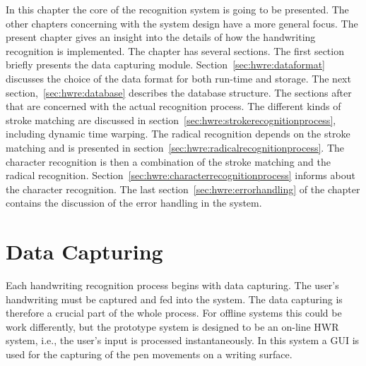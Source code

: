 In this chapter the core of the recognition system is going to be presented.
The other chapters concerning with the system design have a more general focus.
The present chapter gives an insight into the details of how the handwriting
recognition is implemented. The chapter has several sections. The first section
briefly presents the data capturing module. Section~\ref{sec:hwre:dataformat}
discusses the choice of the data format for both run-time and storage.
The next section,~\ref{sec:hwre:database} describes the database structure.
The sections after that are concerned with the actual recognition process.
The different kinds of stroke matching are discussed in 
section~\ref{sec:hwre:strokerecognitionprocess}, including dynamic time warping.
The radical recognition depends on the stroke matching and is presented in
section~\ref{sec:hwre:radicalrecognitionprocess}.
The character recognition is then a combination of the stroke matching and
the radical recognition. Section~\ref{sec:hwre:characterrecognitionprocess}
informs about the character recognition.
The last section~\ref{sec:hwre:errorhandling} of the chapter contains the 
discussion of the error handling in the system.

\section{Data Capturing}
\label{sec:hwre:datacapturing}

Each handwriting recognition process begins with data capturing.
The user's handwriting must be captured and fed into the system. The data 
capturing is therefore a crucial part of the whole process. 
For offline systems this could be work differently, but the prototype system
is designed to be an on-line HWR system, i.e., the user's input is processed
instantaneously.
In this system a GUI is used for the capturing of the pen movements on a 
writing surface.


